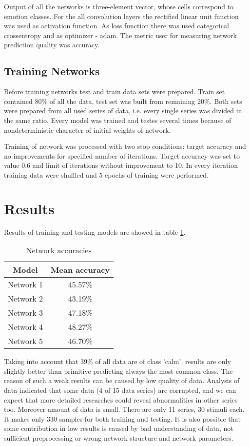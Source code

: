 \documentclass[10pt,journal,compsoc]{IEEEtran}
\begin{document}
Output of all the networks is three-element vector, whose cells correspond to emotion classes. For the all convolution layers the rectified linear unit function was used as activation function. 
As loss function there was used categorical crossentropy and as optimizer - adam. The metric user for measuring network prediction quality was accuracy.

\subsection{Training Networks}
Before training networks test and train data sets were prepared. Train set contained 80\% of all the data, test set was built from remaining 20\%. Both sets were prepared from all used series of data, i.e. every single series was divided in the same ratio. Every model was trained and testes several times because of nondeterministic character of initial weights of network.

Training of network was processed with two stop conditions: target accuracy and no improvements for specified number of iterations. Target accuracy was set to value 0.6 and limit of iterations without improvement to 10. In every iteration training data were shuffled and 5 epochs of training were performed.


\section{Results}
Results of training and testing models are showed in table \ref{table_networks}.
\begin{table}[!t]
\renewcommand{\arraystretch}{1.3}
\caption{Network accuracies}
\label{table_networks}
\centering
\begin{tabular}{|c|c|}
\hline Model&Mean accuracy\\\hline
Network 1&45.57\%\\\hline
Network 2&43.19\%\\\hline
Network 3&47.18\%\\\hline
Network 4&48.27\%\\\hline
Network 5&46.70\%\\\hline
\end{tabular}
\end{table}

Taking into account that 39\% of all data are of class 'calm', results are only slightly better than primitive predicting always the most common class. The reason of such a weak results can be caused by low quality of data. Analysis of data indicated that some data (4 of 15 data series) are corrupted, and we can expect that more detailed researches could reveal abnormalities in other series too. Moreover amount of data is small. There are only 11 series, 30 stimuli each. It makes only 330 samples for both training and testing. It is also possible that some contribution in low results is caused by bad understanding of data, not sufficient preprocessing or wrong network structure and network parameters.
\end{document}
